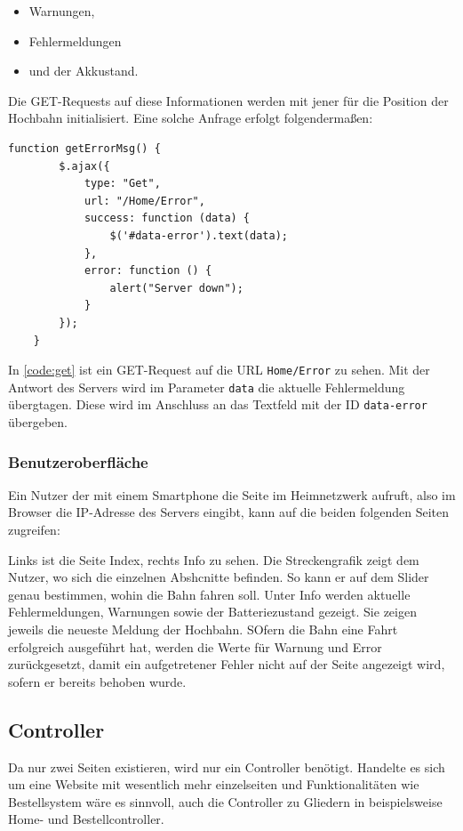 \begin{center}
	\begin{itemize}
		\item Warnungen,
		\item Fehlermeldungen
		\item und der Akkustand.
	\end{itemize}
\end{center}

Die GET-Requests auf diese Informationen werden mit jener für die Position der Hochbahn initialisiert. Eine solche Anfrage erfolgt folgendermaßen:

\begin{lstlisting}[language=html, style=dhpaperdefault]
	function getErrorMsg() {
		$.ajax({
			type: "Get",
			url: "/Home/Error",
			success: function (data) {
				$('#data-error').text(data);
			},
			error: function () {
				alert("Server down");
			}
		});
    }
\end{lstlisting}
\vspace{1cm}
In \autoref{code:get} ist ein GET-Request auf die URL \texttt{Home/Error} zu sehen. Mit der Antwort des Servers wird im Parameter \texttt{data} die aktuelle Fehlermeldung übergtagen. Diese wird im Anschluss an das Textfeld mit der ID \texttt{data-error} übergeben. 

\subsubsection{Benutzeroberfläche}
Ein Nutzer der mit einem Smartphone die Seite im Heimnetzwerk aufruft, also im Browser die IP-Adresse des Servers eingibt, kann auf die beiden folgenden Seiten zugreifen:


Links ist die Seite Index, rechts Info zu sehen. Die Streckengrafik zeigt dem Nutzer, wo sich die einzelnen Abshcnitte befinden. So kann er auf dem Slider genau bestimmen, wohin die Bahn fahren soll. Unter Info werden aktuelle Fehlermeldungen, Warnungen sowie der Batteriezustand gezeigt. Sie zeigen jeweils die neueste Meldung der Hochbahn. SOfern die Bahn eine Fahrt erfolgreich ausgeführt hat, werden die Werte für Warnung und Error zurückgesetzt, damit ein aufgetretener Fehler nicht auf der Seite angezeigt wird, sofern er bereits behoben wurde. 

\subsection{Controller}
Da nur zwei Seiten existieren, wird nur ein Controller benötigt. Handelte es sich um eine Website mit wesentlich mehr einzelseiten und Funktionalitäten wie Bestellsystem wäre es sinnvoll, auch die Controller zu Gliedern in beispielsweise Home- und Bestellcontroller. \\
